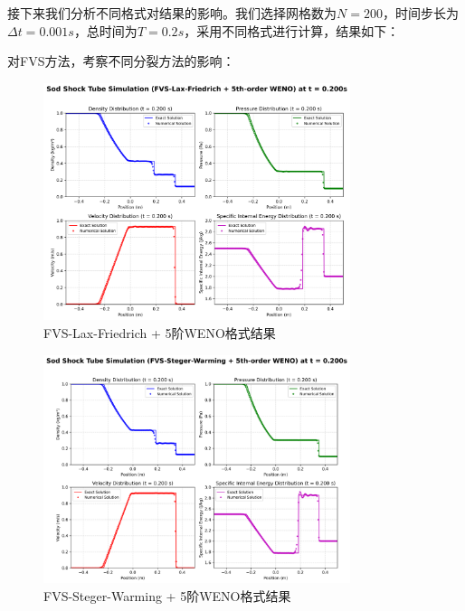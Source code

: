 \documentclass[12pt,a4paper]{article}
\begin{document}
接下来我们分析不同格式对结果的影响。我们选择网格数为$N=200$，时间步长为$\Delta t=0.001s$，总时间为$T=0.2s$，采用不同格式进行计算，结果如下：

对FVS方法，考察不同分裂方法的影响：
\begin{figure}[!htbp]
    \centering
    \includegraphics[width=0.8\textwidth]{Sod_Shock_FVS-Lax-Friedrich + 5th-order WENO_t_0p200s.png}
    \caption{FVS-Lax-Friedrich + 5阶WENO格式结果}
\end{figure}
\begin{figure}[!htbp]
    \centering
    \includegraphics[width=0.8\textwidth]{Sod_Shock_FVS-Steger-Warming + 5th-order WENO_t_0p200s.png}
    \caption{FVS-Steger-Warming + 5阶WENO格式结果}
\end{figure}
\end{document}
